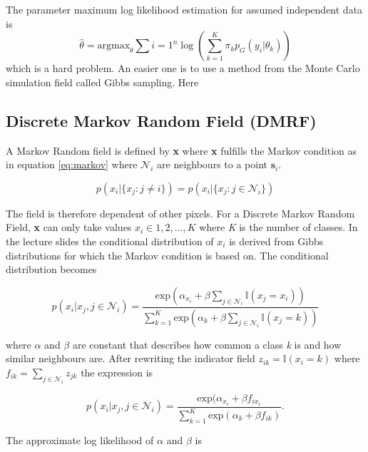 \documentclass[a4paper,english]{article}
\begin{document}
The parameter maximum log likelihood estimation for assumed independent data is
\begin{equation}
  \hat{\theta} = \text{argmax}_{\theta} \sum{i = 1}^n \log \left(  \sum_{k=1}^K \pi_k p_G(y_i | \theta_k) \right)
\end{equation}
which is a hard problem.
An easier one is to use a method from the Monte Carlo simulation field called Gibbs sampling.
Here

\subsection{Discrete Markov Random Field (DMRF)}

A Markov Random field is defined by \textbf{x} where \textbf{x} fulfills the Markov condition as in equation \ref{eq:markov} where $\mathcal{N}_i$ are neighbours to a point $\textbf{s}_i$. 

\begin{equation}
	p(x_i|\{x_j : j\neq i\}) = p(x_i|\{x_j : j\in \mathcal{N}_i\})
	\label{eq:markov}
\end{equation}

The field is therefore dependent of other pixels. For a Discrete Markov Random Field, \textbf{x} can only take values $x_i \in 1,2,...,K$ where \textit{K} is the number of classes. In the lecture slides the conditional distribution of $x_i$ is derived from Gibbs distributions for which the Markov condition is based on. The conditional distribution becomes 

\begin{equation}
p(x_i|x_j,j\in \mathcal{N}_i) = \dfrac{\text{exp}(\alpha_{x_i}+\beta\sum_{j\in \mathcal{N}_i}\mathds{I}(x_j = x_i))}{\sum^K_{k=1}\text{exp}(\alpha_k + \beta\sum_{j\in \mathcal{N}_i}\mathds{I}(x_j = k))}
\end{equation}

where $\alpha$ and $\beta$ are constant that describes how common a class \textit{k} is and how similar neighbours are. After rewriting the indicator field $z_{ik} = \mathds{I}(x_i = k)$ where $f_{ik} = \sum_{j\in \mathcal{N}_i} z_{jk}$ the expression is  
 
\begin{equation}
p(x_i|x_j,j\in \mathcal{N}_i) = \dfrac{\text{exp}(\alpha_{x_i}+\beta f_{ix_i} }{\sum^K_{k=1}\text{exp}(\alpha_k + \beta f_{ik})}.
\end{equation}

The approximate log likelihood of $\alpha$ and $\beta$ is 
\end{document}
